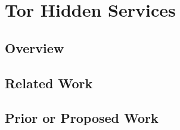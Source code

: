 \section{Tor Hidden Services}
\label{sec:tor}


\subsection{Overview}


\subsection{Related Work}


\subsection{Prior or Proposed Work}
